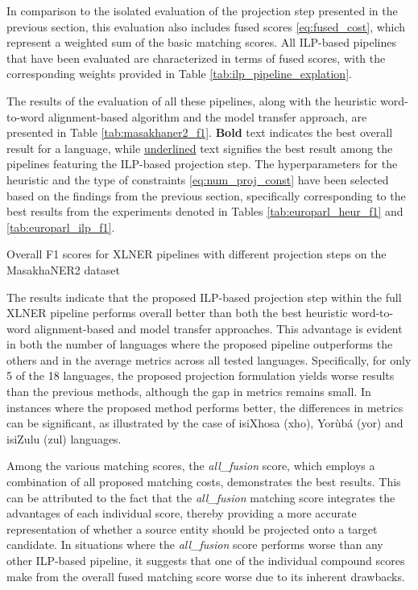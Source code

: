 In comparison to the isolated evaluation of the projection step presented in the
previous section, this evaluation also includes fused scores \eqref{eq:fused_cost},
which represent a weighted sum of the basic matching scores. All ILP-based pipelines
that have been evaluated are characterized in terms of fused scores, with the
corresponding weights provided in Table \ref{tab:ilp_pipeline_explation}.

The results of the evaluation of all these pipelines, along with the heuristic
word-to-word alignment-based algorithm and the model transfer approach, are presented
in Table \ref{tab:masakhaner2_f1}. \textbf{Bold} text indicates the best overall result for a
language, while \underline{underlined} text signifies the best result among the pipelines featuring
the ILP-based projection step. The hyperparameters for the heuristic and the type of
constraints \eqref{eq:num_proj_const} have been selected based on the findings from the
previous section, specifically corresponding to the best results from the experiments
denoted in Tables \ref{tab:europarl_heur_f1} and \ref{tab:europarl_ilp_f1}.

\begin{table}[ht]
  
  \caption{Overall F1 scores for XLNER pipelines with different projection steps on the
  MasakhaNER2 dataset}
  \label{tab:masakhaner2_f1}
\end{table}

The results indicate that the proposed ILP-based projection step within the full
XLNER pipeline performs overall better than both the best heuristic word-to-word
alignment-based and model transfer approaches. This advantage is evident in both
the number of languages where the proposed pipeline outperforms the others and in
the average metrics across all tested languages. Specifically, for only 5 of the 18
languages, the proposed projection formulation yields worse results than the previous
methods, although the gap in metrics remains small. In instances where the proposed
method performs better, the differences in metrics can be significant, as illustrated
by the case of isiXhosa (xho), Yorùbá (yor) and isiZulu (zul) languages.

Among the various matching scores, the \textit{all\_fusion} score, which employs a
combination of all proposed matching costs, demonstrates the best results. This can
be attributed to the fact that the \textit{all\_fusion} matching score integrates the advantages
of each individual score, thereby providing a more accurate representation of whether
a source entity should be projected onto a target candidate. In situations where the
\textit{all\_fusion} score performs worse than any other ILP-based pipeline, it
suggests that one of the individual compound scores make from the overall
fused matching score worse due to its inherent drawbacks.

